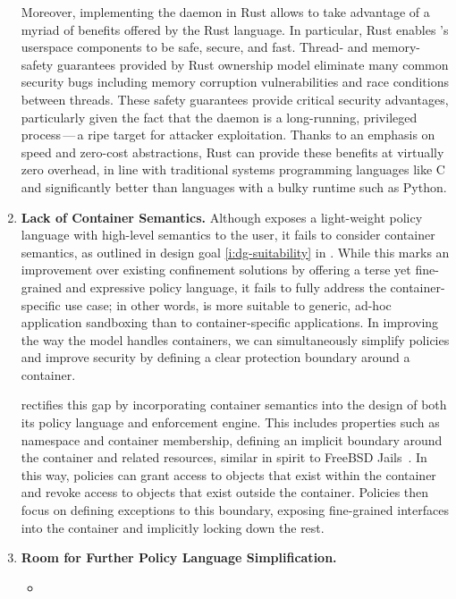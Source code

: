 \begin{enumerate}
    Moreover, implementing the \bpfcontain{} daemon in Rust allows \bpfcontain{} to take
    advantage of a myriad of benefits offered by the Rust language. In particular, Rust
    enables \bpfcontain{}'s userspace components to be safe, secure, and fast. Thread- and
    memory-safety guarantees provided by Rust ownership model eliminate many common
    security bugs including memory corruption vulnerabilities and race conditions between
    threads. These safety guarantees provide critical security advantages, particularly
    given the fact that the \bpfcontain{} daemon is a long-running, privileged
    process\,---\,a ripe target for attacker exploitation. Thanks to an emphasis on speed
    and zero-cost abstractions, Rust can provide these benefits at virtually zero
    overhead, in line with traditional systems programming languages like C and
    significantly better than languages with a bulky runtime such as Python.

  \item \textbf{Lack of Container Semantics.}
    Although \bpfbox{} exposes a light-weight policy language with high-level semantics to
    the user, it fails to consider container semantics, as outlined in design goal
    \ref{i:dg-suitability} in . While this marks an improvement over
    existing confinement solutions by offering a terse yet fine-grained and expressive
    policy language, it fails to fully address the container-specific use case; in other
    words, \bpfbox{} is more suitable to generic, ad-hoc application sandboxing than to
    container-specific applications. In improving the way the \bpfbox{} model handles
    containers, we can simultaneously simplify policies and improve security by defining
    a clear protection boundary around a container.

    \bpfcontain{} rectifies this gap by incorporating container semantics into the design
    of both its policy language and enforcement engine. This includes properties such as
    namespace and container membership, defining an implicit boundary around the container
    and related resources, similar in spirit to FreeBSD Jails~\cite{kamp2000_jails}. In
    this way, \bpfcontain{} policies can grant access to objects that exist within the
    container and revoke access to objects that exist outside the container. Policies then
    focus on defining exceptions to this boundary, exposing fine-grained interfaces into
    the container and implicitly locking down the rest.

  \item \textbf{Room for Further Policy Language Simplification.}
    \begin{inprogress}
      \begin{itemize}
        \item
      \end{itemize}
    \end{inprogress}
\end{enumerate}



